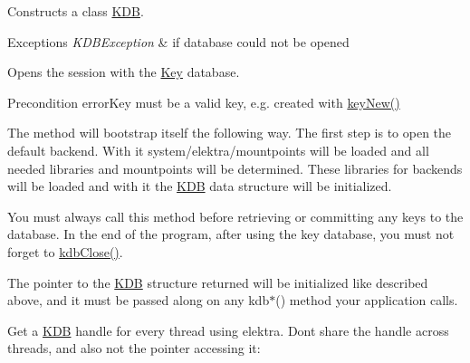 Constructs a class \hyperlink{classkdb_1_1KDB}{K\+DB}. 


\begin{DoxyExceptions}{Exceptions}
{\em K\+D\+B\+Exception} & if database could not be opened\\
\hline
\end{DoxyExceptions}
Opens the session with the \hyperlink{classkdb_1_1Key}{Key} database. \begin{DoxyPrecond}{Precondition}
error\+Key must be a valid key, e.\+g. created with \hyperlink{group__key_gad23c65b44bf48d773759e1f9a4d43b89}{key\+New()}
\end{DoxyPrecond}
The method will bootstrap itself the following way. The first step is to open the default backend. With it system/elektra/mountpoints will be loaded and all needed libraries and mountpoints will be determined. These libraries for backends will be loaded and with it the {\ttfamily \hyperlink{classkdb_1_1KDB}{K\+DB}} data structure will be initialized.

You must always call this method before retrieving or committing any keys to the database. In the end of the program, after using the key database, you must not forget to \hyperlink{group__kdb_gadb54dc9fda17ee07deb9444df745c96f}{kdb\+Close()}.

The pointer to the {\ttfamily \hyperlink{classkdb_1_1KDB}{K\+DB}} structure returned will be initialized like described above, and it must be passed along on any kdb$\ast$() method your application calls.

Get a {\ttfamily \hyperlink{classkdb_1_1KDB}{K\+DB}} handle for every thread using elektra. Don\textquotesingle{}t share the handle across threads, and also not the pointer accessing it\+:


